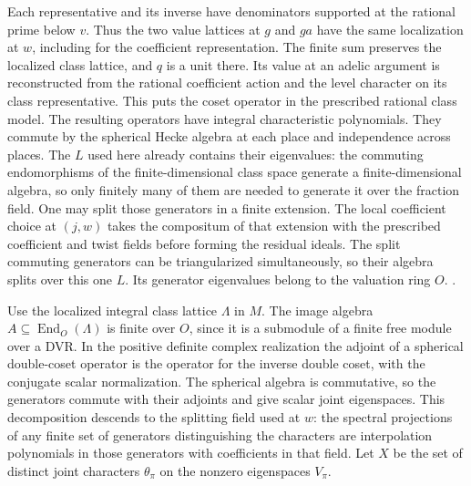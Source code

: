 Each representative and its inverse have denominators supported at
the rational prime below \(v\). Thus the two value lattices at \(g\)
and \(ga\) have the same localization at \(w\), including for the
coefficient representation. The finite sum preserves the localized
class lattice, and \(q\) is a unit there. Its value at an adelic
argument is reconstructed from the rational coefficient action and the
level character on its class representative. This puts the coset
operator in the prescribed rational class model. The resulting operators
have integral characteristic polynomials. They commute by the
spherical Hecke algebra at each place and independence across
places. The \(L\) used here already contains their eigenvalues:
the commuting endomorphisms of the finite-dimensional class space
generate a finite-dimensional algebra, so only finitely many of
them are needed to generate it over the fraction field. One may
split those generators in a finite extension. The local coefficient
choice at \((j,w)\) takes the compositum of that extension with the
prescribed coefficient and twist fields before forming the residual
ideals. The split commuting generators can be triangularized
simultaneously, so their algebra splits over this one \(L\).
Its generator eigenvalues belong to the valuation ring \(O\).
.

Use the localized integral class lattice \(\Lambda\) in \(M\).
The image algebra \(A\subseteq\operatorname{End}_O(\Lambda)\)
is finite over \(O\), since it is a submodule of a finite free
module over a DVR. In the positive definite complex realization
the adjoint of a spherical double-coset operator is the operator
for the inverse double coset, with the conjugate scalar
normalization. The spherical algebra is commutative, so the
generators commute with their adjoints and give scalar joint
eigenspaces. This decomposition descends to the splitting field
used at \(w\): the spectral projections of any finite set of
generators distinguishing the characters are interpolation
polynomials in those generators with coefficients in that field.
Let \(X\) be the set of distinct joint characters \(\theta_\pi\)
on the nonzero eigenspaces \(V_\pi\).

